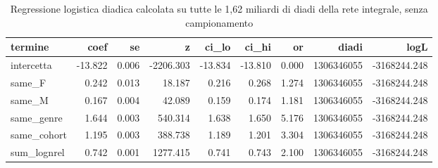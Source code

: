 \begin{table}
\centering
\caption{Regressione logistica diadica calcolata su tutte le 1,62 miliardi di diadi della rete integrale, senza campionamento}
\label{tab:t4_logit_esatto}
\begin{tabular}{lrrrrrrrr}
\toprule
    termine &    coef &    se &         z &   ci\_lo &   ci\_hi &    or &      diadi &         logL \\
\midrule
 intercetta & -13.822 & 0.006 & -2206.303 & -13.834 & -13.810 & 0.000 & 1306346055 & -3168244.248 \\
     same\_F &   0.242 & 0.013 &    18.187 &   0.216 &   0.268 & 1.274 & 1306346055 & -3168244.248 \\
     same\_M &   0.167 & 0.004 &    42.089 &   0.159 &   0.174 & 1.181 & 1306346055 & -3168244.248 \\
 same\_genre &   1.644 & 0.003 &   540.314 &   1.638 &   1.650 & 5.176 & 1306346055 & -3168244.248 \\
same\_cohort &   1.195 & 0.003 &   388.738 &   1.189 &   1.201 & 3.304 & 1306346055 & -3168244.248 \\
sum\_lognrel &   0.742 & 0.001 &  1277.415 &   0.741 &   0.743 & 2.100 & 1306346055 & -3168244.248 \\
\bottomrule
\end{tabular}
\end{table}
